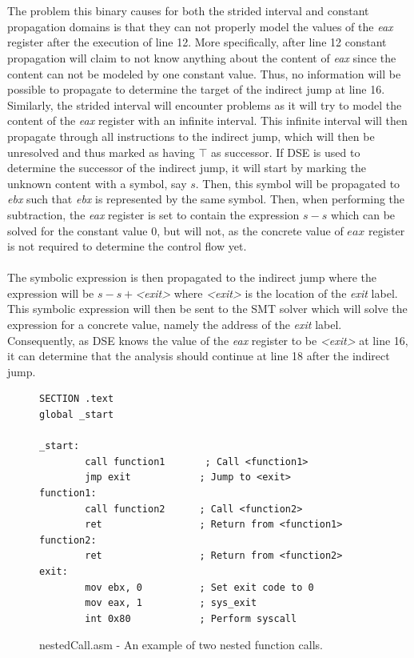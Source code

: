 \documentclass{kththesis}
\renewcommand{\it}[1]{\textit{#1}}
\begin{document}
\\ \\
The problem this binary causes for both the strided interval and constant propagation domains is that they can not properly model the values of the \it{eax} register after the execution of line 12. More specifically, after line 12 constant propagation will claim to not know anything about the content of \it{eax} since the content can not be modeled by one constant value. Thus, no information will be possible to propagate to determine the target of the indirect jump at line 16. Similarly, the strided interval will encounter problems as it will try to model the content of the \it{eax} register with an infinite interval. This infinite interval will then propagate through all instructions to the indirect jump, which will then be unresolved and thus marked as having $\top$ as successor.
\clearpage
\noindent
If DSE is used to determine the successor of the indirect jump, it will start by marking the unknown content with a symbol, say $s$. Then, this symbol will be propagated to \it{ebx} such that \it{ebx} is represented by the same symbol. Then, when performing the subtraction, the \it{eax} register is set to contain the expression $s - s$ which can be solved for the constant value $0$, but will not, as the concrete value of $eax$ register is not required to determine the control flow yet. 
\\ \\ 
The symbolic expression is then propagated to the indirect jump where the expression will be $s - s + $\it{<exit>} where \it{<exit>} is the location of the \it{exit} label. This symbolic expression will then be sent to the SMT solver which will solve the expression for a concrete value, namely the address of the \it{exit} label. Consequently, as DSE knows the value of the \it{eax} register to be \it{<exit>} at line 16, it can determine that the analysis should continue at line 18 after the indirect jump. 
\begin{figure}[!t]
    \centering
\begin{tcolorbox}
\begin{verbatim}
SECTION .text
global _start

_start:
        call function1       ; Call <function1>
        jmp exit            ; Jump to <exit>
function1:
        call function2      ; Call <function2>
        ret                 ; Return from <function1>
function2:
        ret                 ; Return from <function2>
exit:
        mov ebx, 0          ; Set exit code to 0
        mov eax, 1          ; sys_exit
        int 0x80            ; Perform syscall
\end{verbatim}
\end{tcolorbox}
\caption{nestedCall.asm - An example of two nested function calls.}
    \label{fig:nestedCall.asm}
\end{figure}
\end{document}
